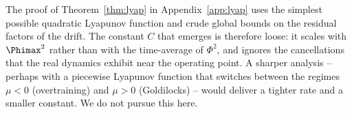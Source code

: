 \begin{remark}\label{rem:lyap-limits}
The proof of Theorem~\ref{thm:lyap} in Appendix~\ref{app:lyap} uses
the simplest possible quadratic Lyapunov function and crude global
bounds on the residual factors of the drift. The constant $C$ that
emerges is therefore loose: it scales with $\Phimax^2$ rather than
with the time-average of $\Phi^2$, and ignores the cancellations
that the real dynamics exhibit near the operating point. A
sharper analysis -- perhaps with a piecewise Lyapunov function that
switches between the regimes $\mu < 0$ (overtraining) and
$\mu > 0$ (Goldilocks) -- would deliver a tighter rate and a
smaller constant. We do not pursue this here.
\end{remark}
